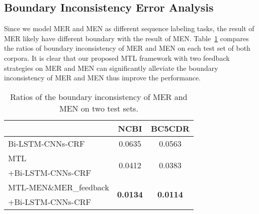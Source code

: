 \subsection{Boundary Inconsistency Error Analysis}
Since we model MER and MEN as different sequence labeling tasks, the result of MER likely have different boundary with the result of MEN. Table~\ref{tab: boundary} compares the ratios of boundary inconsistency of MER and MEN on each test set of both corpora. It is clear that our proposed MTL framework with two feedback strategies on MER and MEN can significantly alleviate the boundary inconsistency of MER and MEN thus improve the performance.
\begin{table}[h]
	\small
	\centering
	\begin{tabularx}{0.47\textwidth}{X|c|c}
		\hline
		&\textbf{NCBI}&\textbf{BC5CDR}\\	
		\hline
		Bi-LSTM-CNNs-CRF&0.0635&0.0563\\
		\hdashline
		MTL &\multirow{2}{*}{0.0412}&\multirow{2}{*}{0.0383}\\
		+Bi-LSTM-CNNs-CRF&\multirow{2}{*}{}&\multirow{2}{*}{}\\
		\hdashline
		MTL-MEN\&MER\_feedback &\multirow{2}{*}{\textbf{0.0134}}&\multirow{2}{*}{\textbf{0.0114}}\\
		+Bi-LSTM-CNNs-CRF&\multirow{2}{*}{}&\multirow{2}{*}{}\\
		\hline
	\end{tabularx}
	\vspace{-0.1in}
	\caption{Ratios of the boundary inconsistency of MER and MEN on two test sets.}\label{tab: boundary}	
	\vspace{-0.2in}
\end{table}

